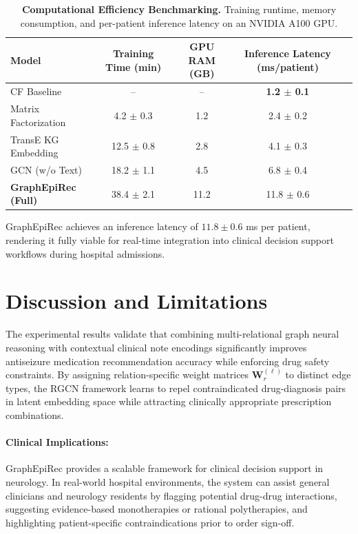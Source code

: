 \documentclass[11pt,a4paper]{article}
\begin{document}
\begin{table}[t]
\begin{table}[h]
\centering
\caption{\textbf{Computational Efficiency Benchmarking.} Training runtime, memory consumption, and per-patient inference latency on an NVIDIA A100 GPU.}
\label{tab:efficiency}
\small
\begin{tabular}{lcccc}
\toprule
\textbf{Model} & \textbf{Training Time (min)} & \textbf{GPU RAM (GB)} & \textbf{Inference Latency (ms/patient)} \\
\midrule
CF Baseline & -- & -- & \textbf{1.2 $\pm$ 0.1} \\
Matrix Factorization & 4.2 $\pm$ 0.3 & 1.2 & 2.4 $\pm$ 0.2 \\
TransE KG Embedding & 12.5 $\pm$ 0.8 & 2.8 & 4.1 $\pm$ 0.3 \\
GCN (w/o Text) & 18.2 $\pm$ 1.1 & 4.5 & 6.8 $\pm$ 0.4 \\
\textbf{GraphEpiRec (Full)} & 38.4 $\pm$ 2.1 & 11.2 & 11.8 $\pm$ 0.6 \\
\bottomrule
\end{tabular}
\end{table}

GraphEpiRec achieves an inference latency of $11.8 \pm 0.6$ ms per patient, rendering it fully viable for real-time integration into clinical decision support workflows during hospital admissions.

\section{Discussion and Limitations}

The experimental results validate that combining multi-relational graph neural reasoning with contextual clinical note encodings significantly improves antiseizure medication recommendation accuracy while enforcing drug safety constraints. By assigning relation-specific weight matrices $\mathbf{W}_r^{(\ell)}$ to distinct edge types, the RGCN framework learns to repel contraindicated drug-diagnosis pairs in latent embedding space while attracting clinically appropriate prescription combinations.

\paragraph{Clinical Implications:}
GraphEpiRec provides a scalable framework for clinical decision support in neurology. In real-world hospital environments, the system can assist general clinicians and neurology residents by flagging potential drug-drug interactions, suggesting evidence-based monotherapies or rational polytherapies, and highlighting patient-specific contraindications prior to order sign-off.


\end{table}
\end{document}
